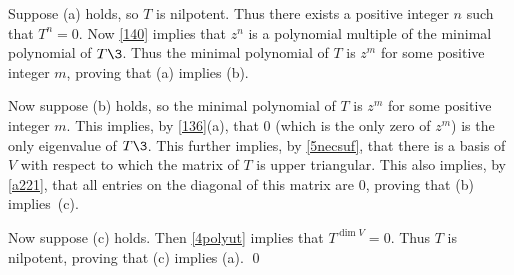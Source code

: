 
\proof
Suppose (a) holds, so $T$ is nilpotent. Thus there exists a positive integer $n$ such that $T^n = 0$. Now \ref{140} implies that $z^n$ is a polynomial multiple of the minimal polynomial of $T\3$. Thus the minimal polynomial of $T$ is $z^m$ for some positive integer $m$, proving that (a) implies (b).

Now suppose (b) holds, so the minimal polynomial of $T$ is $z^m$ for some positive integer $m$. This implies, by \ref{136}(a), that $0$ \big(which is the only zero of $z^m$\big) is the only eigenvalue of $T\3$. This further implies, by \ref{5necsuf}, that there is a basis of $V$ with respect to which the matrix of $T$ is upper triangular. This also implies, by \ref{a221}, that all entries on the diagonal of this matrix are $0$, proving that (b) implies~(c).

Now suppose (c) holds. Then \ref{4polyut} implies that $T^{\dim V} = 0$. Thus $T$ is nilpotent, proving that (c) implies (a).
\qed

\pagebreak[3]

